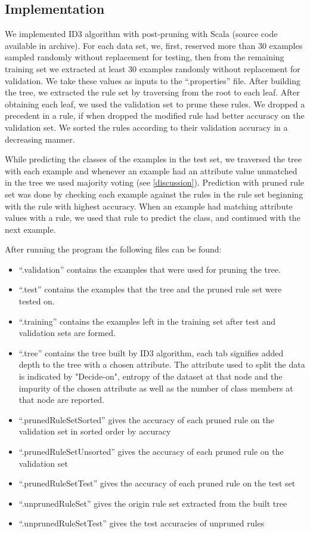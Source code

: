 \documentclass[12pt]{article}
\begin{document}
\subsection{Implementation}
We implemented ID3 algorithm with post-pruning with Scala (source code
available in archive). For each data set, we, first, reserved more
than 30 examples sampled randomly without replacement for testing,
then from the remaining training set we extracted at least 30 examples
randomly without replacement for validation. We take these values as
inputs to the ``.properties'' file. After building the tree, we
extracted the rule set by traversing from the root to each leaf. After
obtaining each leaf, we used the validation set to prune these
rules. We dropped a precedent in a rule, if when dropped the modified
rule had better accuracy on the validation set. We sorted the rules
according to their validation accuracy in a decreasing manner.

While predicting the classes of the examples in the test set, we
traversed the tree with each example and whenever an example had an
attribute value unmatched in the tree we used majority voting (see
\ref{discussion}). Prediction with pruned rule set was done by
checking each example against the rules in the rule set beginning with
the rule with highest accuracy. When an example had matching attribute
values with a rule, we used that rule to predict the class, and
continued with the next example.

After running the program the following files can be found:
\begin{itemize}
   \item ``.validation'' contains the examples that were used for pruning the tree.
   \item ``.test'' contains the examples that the tree and the pruned rule set were tested on.
   \item ``.training'' contains the examples left in the training set after test and validation sets are formed.
   \item ``.tree'' contains the tree built by ID3 algorithm, each tab signifies added depth to the tree with a chosen attribute. The attribute used to split the data is indicated by "Decide-on", entropy of the dataset at that node and the impurity of the chosen attribute as well as the number of class members at that node are reported.
   \item ``.prunedRuleSetSorted'' gives the accuracy of each pruned rule on the validation set in sorted order by accuracy
   \item ``.prunedRuleSetUnsorted'' gives the accuracy of each pruned rule on the validation set   
   \item ``.prunedRuleSetTest'' gives the accuracy of each pruned rule on the test set
   \item ``.unprunedRuleSet'' gives the origin rule set extracted from the built tree
   \item ``.unprunedRuleSetTest'' gives the test accuracies of unpruned rules  
\end{itemize}
\end{document}
